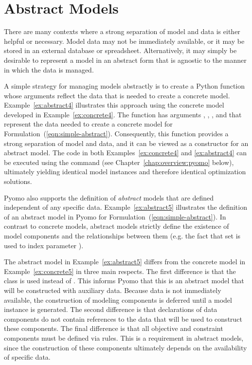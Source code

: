 \section{Abstract Models}
\label{chap:overview-abstractmodels}

There are many contexts where a strong separation of model and data is
either helpful or necessary.  Model data may not be immediately available,
or it may be stored in an external database or spreadsheet.  Alternatively, it may simply be
desirable to represent a model in an abstract form that is agnostic to 
the manner in which the data is managed.

A simple strategy for managing models abstractly is to create a Python
function whose arguments reflect the data that is needed to create a
concrete model.  Example~\ref{ex:abstract4} illustrates this approach
using the concrete model developed in Example~\ref{ex:concrete4}. 
The function  has arguments , ,
,  and  that represent the data needed to create
a concrete model for Formulation~(\ref{eqn:simple-abstract}).  Consequently,
this function provides a strong separation of model and data, and
it can be viewed as a constructor for an abstract model. The code in
both Examples~\ref{ex:concrete4} and \ref{ex:abstract4} can be executed
using the  command (see Chapter~\ref{chap:overview:pyomo} below),
ultimately yielding identical model instances and therefore 
identical optimization solutions.

Pyomo also supports the definition of \textit{abstract} models that are defined
independent of any specific data. Example~\ref{ex:abstract5} illustrates 
the definition of an abstract model in Pyomo for Formulation~(\ref{eqn:simple-abstract}).  
In contrast to concrete models, abstract models strictly define the existence of model
components and the relationships between them (e.g. the fact that set  is used
to index parameter ). 

The abstract model in Example~\ref{ex:abstract5} differs from the concrete model in 
Example~\ref{ex:concrete5} in three main respects. The first difference is that the class 
 is used instead of .  This informs Pyomo that this is 
an abstract model that will be constructed with auxiliary data.  Because data is not immediately 
available, the construction of modeling components is deferred until a model instance is generated.  The second difference is that 
declarations of data components do not contain references to the data that will be used to 
construct these components.  The final difference is that all objective and constraint 
components must be defined via rules. This is a requirement in abstract models, since the 
construction of these components ultimately depends on the availability of specific data.

